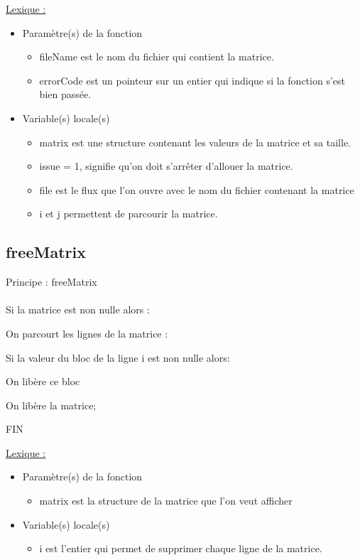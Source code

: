 \documentclass[a4paper]{article}
\newcommand\tab[1][1cm]{\hspace*{#1}}
\begin{document}
\underline{Lexique :}
\begin{itemize}
\item Paramètre(s) de la fonction  
\begin{itemize}
\item fileName est le nom du fichier qui contient la matrice.
\item errorCode est un pointeur sur un entier qui indique si la fonction s'est bien passée.
\end{itemize}
\item Variable(s) locale(s)
\begin{itemize}
\item matrix est une structure contenant les valeurs de la matrice et sa taille.
\item issue = 1, signifie qu'on doit s'arrêter d'allouer la matrice.
\item file est le flux que l'on ouvre avec le nom du fichier contenant la matrice
\item i et j permettent de parcourir la matrice.
\end{itemize}
\end{itemize}

\subsection{freeMatrix}
\begin{algorithm}
Principe : freeMatrix
\\
\\
\tab Si la matrice est non nulle alors : 

\tab \tab On parcourt les lignes de la matrice : 

\tab \tab \tab Si la valeur du bloc de la ligne i est non nulle alors: 

\tab \tab \tab \tab On libère ce bloc

\tab \tab On libère la matrice; 

FIN
\end{algorithm}

\underline{Lexique :}
\begin{itemize}
\item Paramètre(s) de la fonction  
\begin{itemize}
\item matrix est la structure de la matrice que l'on veut afficher
\end{itemize}
\item Variable(s) locale(s)
\begin{itemize}
\item i est l'entier qui permet de supprimer chaque ligne de la matrice.
\end{itemize}
\end{itemize}
\newpage
\end{document}
